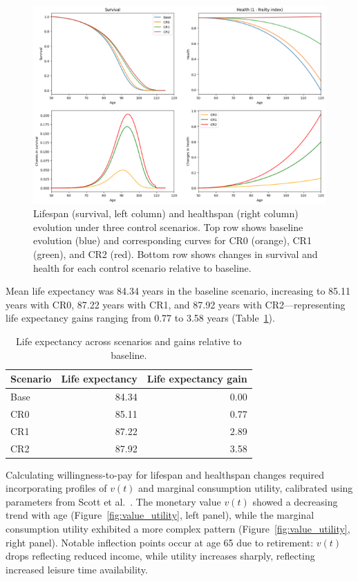 \begin{figure}[h]
\centering
\small
\includegraphics[width=\textwidth]{figures/Figure6.png}
\caption{Lifespan (survival, left column) and healthspan (right column) evolution under three control scenarios. Top row shows baseline evolution (blue) and corresponding curves for CR0 (orange), CR1 (green), and CR2 (red). Bottom row shows changes in survival and health for each control scenario relative to baseline.}
\label{fig:lifespan_healthspan}
\end{figure}

Mean life expectancy was 84.34 years in the baseline scenario, increasing to 85.11 years with CR0, 87.22 years with CR1, and 87.92 years with CR2—representing life expectancy gains ranging from 0.77 to 3.58 years (Table~\ref{tab:lifeexp}).

\begin{table}[h]
\centering
\small
\setlength{\tabcolsep}{5pt}
\begin{tabular}{lrr}
\toprule
\textbf{Scenario} & \textbf{Life expectancy} & \textbf{Life expectancy gain} \\
\midrule
Base & 84.34 & 0.00 \\
CR0 & 85.11 & 0.77 \\
CR1 & 87.22 & 2.89 \\
CR2 & 87.92 & 3.58 \\
\bottomrule
\end{tabular}
\caption{Life expectancy across scenarios and gains relative to baseline.}
\label{tab:lifeexp}
\end{table}

Calculating willingness-to-pay for lifespan and healthspan changes required incorporating profiles of $v(t)$ and marginal consumption utility, calibrated using parameters from Scott et al.~\cite{Scott2023b}. The monetary value $v(t)$ showed a decreasing trend with age (Figure~\ref{fig:value_utility}, left panel), while the marginal consumption utility exhibited a more complex pattern (Figure~\ref{fig:value_utility}, right panel). Notable inflection points occur at age 65 due to retirement: $v(t)$ drops reflecting reduced income, while utility increases sharply, reflecting increased leisure time availability.

